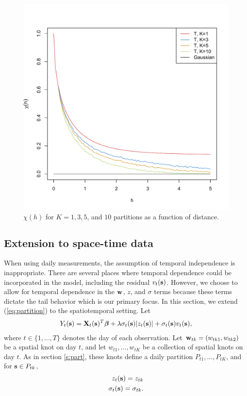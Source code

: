 \documentclass[11pt]{article}
\begin{document}
\begin{figure}
  \centering
  \includegraphics[width=0.5\linewidth]{plots/chi-h.pdf}
  \caption{$\chi(h)$ for $K = 1, 3, 5$, and $10$ partitions as a function of distance.}
  \label{fig:chi}
\end{figure}


\subsection{Extension to space-time data} \label{s:temporal}
When using daily measurements, the assumption of temporal independence is inappropriate.
There are several places where temporal dependence could be incorporated in the model, including the residual $v_t(\mbox{\bf s})$.
However, we choose to allow for temporal dependence in the $\mbox{\bf w}$, $z$, and $\sigma$ terms because these terms dictate the tail behavior which is our primary focus.
In this section, we extend (\ref{eq:partition}) to the spatiotemporal setting.
Let
\begin{align} \label{eq:spatiotemp}
  Y_t(\mbox{\bf s}) = \mbox{\bf X}_t(\mbox{\bf s})^T \mbox{\boldmath $\beta$} + \lambda \sigma_t(\mbox{\bf s}) |z_t(\mbox{\bf s})| + \sigma_t(\mbox{\bf s}) v_t(\mbox{\bf s}),
\end{align}
where $t \in \{1, \ldots, T\}$ denotes the day of each observation.
Let \hbox{$\mbox{\bf w}_{tk} = (w_{tk1}, w_{tk2})$} be a spatial knot on day $t$, and let $w_{t1}, \ldots, w_{tK}$ be a collection of spatial knots on day $t$.
As in section \ref{s:part}, these knots define a daily partition $P_{t1}, \ldots, P_{tK}$, and for $\mbox{\bf s} \in P_{tk}$,
\begin{align}
  z_t(\mbox{\bf s}) = z_{tk}\\
  \sigma_{t}(\mbox{\bf s}) = \sigma_{tk}.
\end{align}
\end{document}

